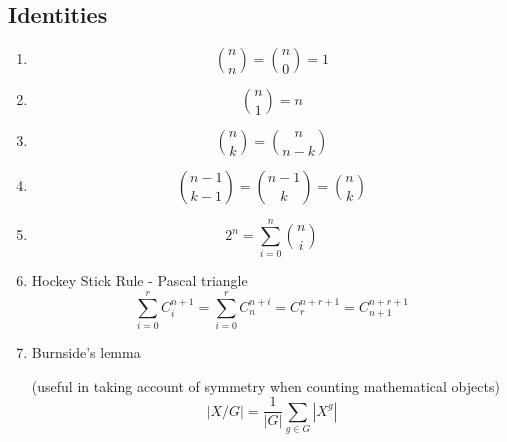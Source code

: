 %
%
%
%
% 
%
%
%

\subsection{Identities}
\begin{enumerate}

\item
\begin{equation}
  {n \choose n} = {n \choose 0} = 1
\end{equation}

\item
\begin{equation}
  {n \choose 1} = n
\end{equation}

\item
\begin{equation}
  {n \choose k} = {n \choose n-k}
\end{equation}

\item
\begin{equation}
  {n-1 \choose k-1} = {n-1 \choose k} = {n \choose k}
\end{equation}

\item
\begin{equation}
  2^n = \sum_{i = 0}^{n} {n \choose i}
\end{equation}

\item
Hockey Stick Rule - Pascal triangle
\begin{equation}
  \sum_{i = 0}^{r}{C_{i}^{n+1}} = \sum_{i = 0}^{r}{C_{n}^{n+i}} = {C_{r}^{n+r+1}} = {C_{n+1}^{n+r+1}}
\end{equation}

\item
Burnside's lemma

(useful in taking account of symmetry when counting mathematical objects)
\begin{equation}
  |X/G| = \frac{1}{|G|} \sum_{g\in G} |X^{g}|
\end{equation}


\end{enumerate}


